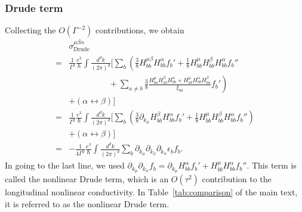 \documentclass[twocolumn,superscriptaddress]{revtex4-1}
\newcommand{\smrm}[1]{_{\mathrm{#1}}}
\begin{document}
\subsubsection{Drude term}\label{app:NLD}
Collecting the $O(\Gamma^{-2})$ contributions, we obtain
\begin{align}
  &\sigma\smrm{Drude}^{\mu\beta\alpha}\nonumber \\
  =&\frac{1}{\Gamma^2}\frac{e^3}{\hbar}\int \frac{d^d k}{(2\pi)^d}\Biggl[\sum_b\left(
    \frac{3}{8}H_{bb}^{\mu\beta}H_{bb}^\alpha f_b' +\frac{1}{8}H_{bb}^\mu H_{bb}^\beta H_{bb}^\alpha f_b'' \right. \nonumber \\
   &\left. \hspace{2cm} +\sum_{a\neq b}\frac{3}{8}\frac{H_{ba}^\mu H_{ab}^\beta H_{bb}^\alpha +H_{ab}^\mu H_{bb}^\alpha H_{ba}^\beta}{\xi_{ba}}f_b'
  \right) \nonumber \\
  &+(\alpha \leftrightarrow \beta)\Biggr] \nonumber \\
  =&\frac{1}{\Gamma^2}\frac{e^3}{\hbar}\int \frac{d^d k}{(2\pi)^d}\Biggl[\sum_b\left(\frac{3}{8}\partial_{k_\mu} H_{bb}^\beta H_{bb}^\alpha f_b' +\frac{1}{8}H_{bb}^\mu H_{bb}^\beta H_{bb}^\alpha f_b'' \right) \nonumber \\
  &+(\alpha \leftrightarrow \beta) \Biggr]\nonumber \\
  =&-\frac{1}{4\Gamma^2}\frac{e^3}{\hbar}\int \frac{d^d k}{(2\pi)^d}\sum_b\partial_{k_\mu} \partial_{k_\beta} \partial_{k_\alpha} \epsilon_b f_b.
\end{align}
In going to the last line, we used $\partial_{k_\mu} \partial_{k_\alpha} f_b=\partial_{k_\mu} H_{bb}^\alpha f_b' +H_{bb}^\mu H_{bb}^\alpha f_b''$.
This term is called the nonlinear Drude term, which is an $O(\tau^2)$ contribution to the longitudinal nonlinear conductivity.
In Table~\ref{tab:comparison} of the main text, it is referred to as the nonlinear Drude term.
\end{document}
